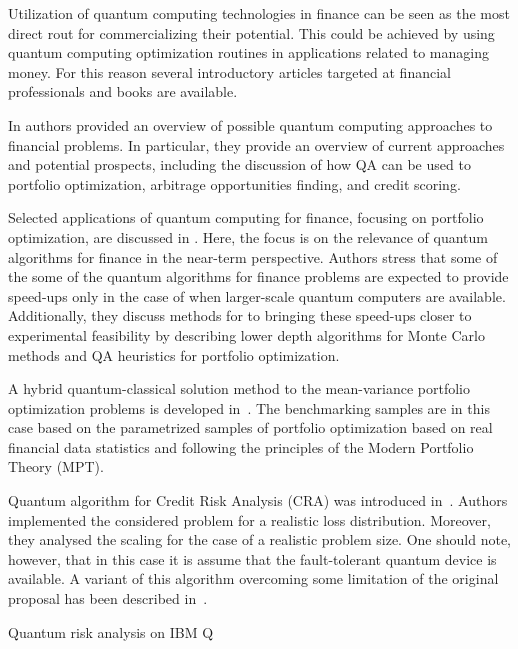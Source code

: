 \documentclass[a4paper,11pt]{article}
\begin{document}
Utilization of quantum computing technologies in finance can be seen as the most direct rout for commercializing their potential. This could be achieved by using quantum computing optimization routines in applications related to managing money. For this reason several introductory articles targeted at financial professionals and books are available.

In \cite{orus2019quantum} authors provided an overview of possible quantum computing approaches to financial problems. In particular, they provide an overview of current approaches and potential prospects, including the discussion of how QA can be used to portfolio optimization, arbitrage opportunities finding, and credit scoring.

Selected applications of quantum computing for finance, focusing on portfolio optimization, are discussed in \cite{bouland2020prospects}. Here, the focus is on  the relevance of quantum algorithms for finance in the near-term perspective. Authors stress that some of the some of the quantum algorithms for finance problems are expected to provide speed-ups only in the case of when larger-scale quantum computers are available. Additionally, they discuss methods for to bringing these speed-ups closer to experimental feasibility by describing lower depth algorithms for Monte Carlo methods and QA heuristics for portfolio optimization.

A hybrid quantum-classical solution method to the mean-variance portfolio optimization problems is developed in~\cite{venturelli2019reverse}. The benchmarking samples are in this case based on the parametrized samples of portfolio optimization based on real financial data statistics and following the principles of the Modern Portfolio Theory (MPT).


Quantum algorithm for Credit Risk Analysis (CRA) was introduced in~\cite{egger2021credit}. Authors implemented the considered problem for a realistic loss distribution. Moreover, they analysed the scaling  for the case of a realistic problem size. One should note, however, that in this case it is assume that the fault-tolerant quantum device is available. A variant of this algorithm overcoming some limitation of the original proposal has been described in~\cite{dri2022towards,dri2023more}.


Quantum risk analysis on IBM Q~\cite{woerner2019quantum}

\newpage 

\end{document}
